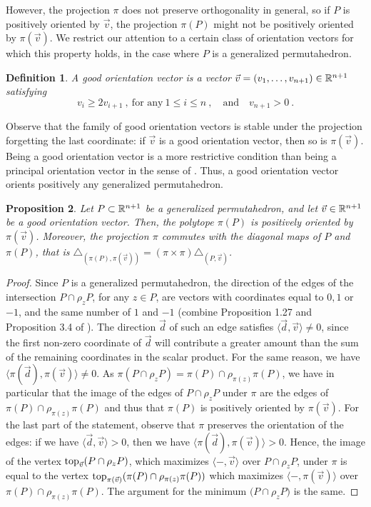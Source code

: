 \documentclass[twoside, 11pt]{amsart}
\newtheorem{definition}{Definition}[section]
\newtheorem{proposition}[definition]{Proposition}
\theoremstyle{remark}
\begin{document}
However, the projection $\pi$ does not preserve orthogonality in general, so if $P$ is positively oriented by $\vec v$, the projection $\pi(P)$ might not be positively oriented by $\pi(\vec v)$.  
We restrict our attention to a certain class of orientation vectors for which this property holds, in the case where $P$ is a generalized permutahedron.

\begin{definition} 
\label{def:goodvector}
A \emph{good orientation vector} is a vector $\vec v=(v_1, \ldots, v_{n+1})\in \mathbb{R}^{n+1}$ satisfying \[v_{i}\geq2v_{i+1}\ , \ \text{for any}\  1\leq i\leq n\ , \quad \text{and}\quad  v_{n+1}>0 \ . \]
\end{definition}

Observe that the family of good orientation vectors is stable under the projection forgetting the last coordinate: if $\vec v$ is a good orientation vector, then so is $\pi(\vec v)$.
Being a good orientation vector is a more restrictive condition than being a principal orientation vector in the sense of \cite[Definition 3.15]{LA21}. Thus, a good orientation vector orients positively any generalized permutahedron. 

\begin{proposition} 
\label{prop:goodprojection}
Let $P \subset \mathbb{R}^{n+1}$ be a generalized permutahedron, and let $\vec v \in \mathbb{R}^{n+1}$ be a good orientation vector. 
Then, the polytope $\pi(P)$ is positively oriented by $\pi(\vec v)$. 
Moreover, the projection $\pi$ commutes with the diagonal maps of $P$ and $\pi(P)$, that is $\triangle_{(\pi(P),\pi(\vec v))}=(\pi \times \pi)\triangle_{(P,\vec v)}$.
\end{proposition}

\begin{proof} 
Since $P$ is a generalized permutahedron, the direction of the edges of the intersection $P\cap\rho_z P$, for any $z \in P$, are vectors with coordinates equal to $0,1$ or $-1$, and the same number of $1$ and $-1$ (combine Proposition 1.27 and Proposition 3.4 of \cite{LA21}). 
The direction $\vec d$ of such an edge satisfies $\langle \vec d, \vec v \rangle \neq 0$, since the first non-zero coordinate of $\vec d$ will contribute a greater amount than the sum of the remaining coordinates in the scalar product.  
For the same reason, we have $\langle \pi(\vec d), \pi(\vec v) \rangle \neq 0$. As $\pi(P\cap\rho_z P)=\pi(P)\cap\rho_{\pi(z)}\pi(P)$, we have in particular that the image of the edges of $P\cap\rho_z P$ under $\pi$ are the edges of $\pi(P)\cap\rho_{\pi(z)}\pi(P)$ and thus that $\pi(P)$ is positively oriented by $\pi(\vec v)$. 
For the last part of the statement, observe that $\pi$ preserves the orientation of the edges: if we have $\langle \vec d, \vec v \rangle >0$, then we have $\langle \pi(\vec d), \pi(\vec v) \rangle > 0$. 
Hence, the image of the vertex $\operatorname{top}_{\vec v}(P\cap\rho_z P)$, which maximizes $\langle - ,\vec v \rangle$ over $P\cap\rho_z P$, under $\pi$ is equal to the vertex $\operatorname{top}_{\pi(\vec v)}(\pi(P)\cap\rho_{\pi(z)} \pi(P))$ which maximizes $\langle - ,\pi(\vec v) \rangle$ over $\pi(P)\cap\rho_{\pi(z)} \pi(P)$. The argument for the minimum $\bm(P\cap\rho_z P)$ is the same.
\end{proof}
\end{document}
